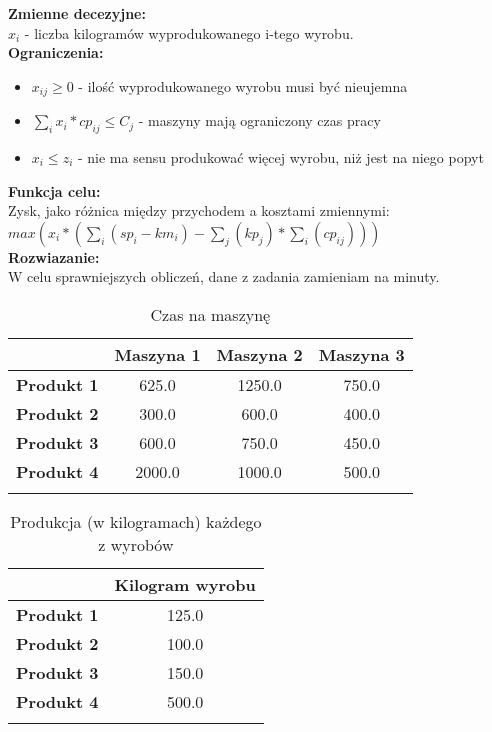 \documentclass[15pt, a4paper]{article}
\begin{document}
\noindent\textbf{Zmienne decezyjne:}\\

\(x_{i}\) - liczba kilogramów wyprodukowanego i-tego wyrobu.\\

\noindent\textbf{Ograniczenia:}

\begin{itemize}
    \item \(x_{ij} \geq 0 \) - ilość wyprodukowanego wyrobu musi być nieujemna
    \item \(\sum_{i}x_{i} * cp_{ij} \leq C_j\)  - maszyny mają ograniczony czas pracy 
    \item \(x_{i} \leq z_i \) - nie ma sensu produkować więcej wyrobu, niż jest na niego popyt 
\end{itemize}

\noindent\textbf{Funkcja celu:}\\

Zysk, jako różnica między przychodem a kosztami zmiennymi:\\ \(max( x_{i} * ( \sum_{i}( sp_i - km_{i} ) - \sum_{j}(kp_j) * \sum_{i}(cp_{ij})  ))\)\\

\noindent\textbf{Rozwiazanie:}\\ 

W celu sprawniejszych obliczeń, dane z zadania zamieniam na minuty. 


\begin{longtable}{|c|c|c|c|}
\hline
& \textbf{Maszyna 1} &  \textbf{Maszyna 2} & \textbf{Maszyna 3} \\ 
\hline
\textbf{Produkt 1} & 625.0 & 1250.0 & 750.0  \\ 
\hline
\textbf{Produkt 2} & 300.0 & 600.0 & 400.0  \\ 
\hline
\textbf{Produkt 3} & 600.0 & 750.0 & 450.0  \\ 
\hline
\textbf{Produkt 4} & 2000.0 & 1000.0 & 500.0  \\ 
\hline
\caption{Czas na maszynę}
\end{longtable}


\begin{longtable}{|c|c|}
    \hline
    & \textbf{Kilogram wyrobu} \\ 
    \hline
    \textbf{Produkt 1} & 125.0 \\ 
    \hline
    \textbf{Produkt 2} & 100.0 \\ 
    \hline
    \textbf{Produkt 3} & 150.0 \\ 
    \hline
    \textbf{Produkt 4} & 500.0 \\ 
    \hline
\caption{Produkcja (w kilogramach) każdego z wyrobów}
\end{longtable}
\end{document}
